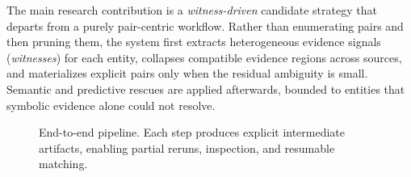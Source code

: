 \documentclass[10pt,twocolumn]{article}
\begin{document}
The main research contribution is a \emph{witness-driven} candidate
strategy that departs from a purely pair-centric workflow. Rather than
enumerating pairs and then pruning them, the system first extracts
heterogeneous evidence signals (\emph{witnesses}) for each entity, collapses
compatible evidence regions across sources, and materializes explicit pairs
only when the residual ambiguity is small. Semantic and predictive rescues
are applied afterwards, bounded to entities that symbolic evidence alone
could not resolve.

\begin{figure}[t]
\centering
{}
\caption{End-to-end pipeline. Each step produces explicit intermediate
  artifacts, enabling partial reruns, inspection, and resumable matching.}
\label{fig:workflow}
\end{figure}
\end{document}
